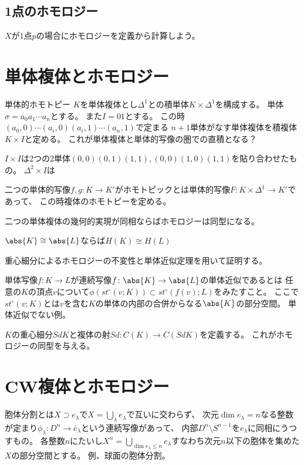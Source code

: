 \documentclass{jsarticle}
\begin{document}
\subsection{1点のホモロジー}
$X$が1点$p$の場合にホモロジーを定義から計算しよう。

\section{単体複体とホモロジー}
単体的ホモトピー
$K$を単体複体とし$\Delta^1$との積単体$K\times\Delta^1$を構成する。
単体$\sigma=a_0a_1\cdots a_n$とする。
また$I=01$とする。
この時$(a_0,0)\cdots(a_i,0)(a_i,1)\cdots(a_n,1)$で定まる $n+1$単体がなす単体複体を積複体$K\times I$と定める。
これが単体複体と単体的写像の圏での直積となる？
\begin{eg}
$I\times I$は2つの$2$単体$(0,0)(0,1)(1,1), (0,0)(1,0)(1,1)$を貼り合わせたもの。
$\Delta^2\times I$は
\end{eg}
二つの単体的写像$f,g\colon K\to K'$がホモトピックとは単体的写像$F:K\times\Delta^1\to K'$であって、
この時複体のホモトピーを定める。

二つの単体複体の幾何的実現が同相ならばホモロジーは同型になる。
\begin{thm}
$\abs{K}\cong\abs{L}$ならば$H(K)\cong H(L)$
\end{thm}
重心細分によるホモロジーの不変性と単体近似定理を用いて証明する。

単体写像$f\colon K\to L$が連続写像$f\colon\abs{K}\to\abs{L}$の単体近似であるとは
任意の$K$の頂点$v$について$\phi(st^\circ(v;K))\subset st^\circ(f(v);L)$をみたすこと。
ここで$st^\circ(v;K)$とは$v$を含む$K$の単体の内部の合併からなる$\abs{K}$の部分空間。
単体近似でない例。

$K$の重心細分$SdK$と複体の射$Sd\colon C(K)\to C(SdK)$を定義する。
これがホモロジーの同型を与える。

\section{CW複体とホモロジー}
胞体分割とは$X\supset e_\lambda$で$X=\bigcup_\lambda e_\lambda$で互いに交わらず、
次元$\dim e_\lambda=n$なる整数が定まり$\phi_\lambda\colon D^n\to \bar{e}_\lambda$という連続写像があって、
内部$D^n\setminus S^{n-1}$を$e_\lambda$に同相にうつすもの。
各整数$n$にたいし$X^n=\bigcup_{\dim e_\lambda\leq n}e_\lambda$すなわち次元$n$以下の胞体を集めた$X$の部分空間とする。
例、球面の胞体分割。
\end{document}
